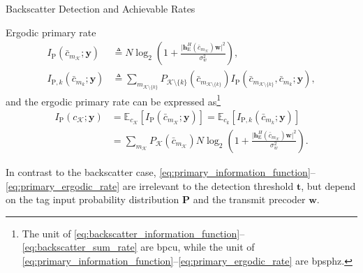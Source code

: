 \documentclass[journal]{IEEEtran}
\begin{document}
\begin{section}{Backscatter Detection and Achievable Rates}
\begin{subsection}{Ergodic primary rate}
			\begin{align}
				I_{\mathrm{P}}(\bar{c}_{m_{\mathcal{K}}};\boldsymbol{y})
				& \triangleq N \log_2 \left(1 + \frac{\lvert \boldsymbol{h}_{\mathrm{E}}^H(\bar{c}_{m_{\mathcal{K}}}) \boldsymbol{w} \rvert^2}{\sigma_w^2}\right),\label{eq:primary_information_function}\\
				I_{\mathrm{P},k}(\bar{c}_{m_k};\boldsymbol{y})
				& \triangleq \sum_{m_{\mathcal{K} \setminus \{k\}}} P_{\mathcal{K} \setminus \{k\}}(\bar{c}_{m_{\mathcal{K} \setminus \{k\}}}) I_{\mathrm{P}}(\bar{c}_{m_{\mathcal{K} \setminus \{k\}}},\bar{c}_{m_k};\boldsymbol{y}),\label{eq:primary_marginal_information_function}
			\end{align}
			and the ergodic primary rate can be expressed as\footnote{The unit of \eqref{eq:backscatter_information_function}--\eqref{eq:backscatter_sum_rate} are \gls{bpcu}, while the unit of \eqref{eq:primary_information_function}--\eqref{eq:primary_ergodic_rate} are \gls{bpsphz}.}
			\begin{subequations}
				\begin{align}
					I_{\mathrm{P}}(c_{\mathcal{K}};\boldsymbol{y})
					& = \mathbb{E}_{c_{\mathcal{K}}} \left[I_{\mathrm{P}}(\bar{c}_{m_{\mathcal{K}}};\boldsymbol{y})\right] = \mathbb{E}_{c_k} \left[I_{\mathrm{P},k}(\bar{c}_{m_k};\boldsymbol{y})\right]\label{eq:primary_ergodic_rate_expectation}\\
					& = \sum_{m_{\mathcal{K}}} P_{\mathcal{K}}(\bar{c}_{m_{\mathcal{K}}}) N \log_2 \left(1 + \frac{\lvert \boldsymbol{h}_{\mathrm{E}}^H(\bar{c}_{m_{\mathcal{K}}}) \boldsymbol{w} \rvert^2}{\sigma_w^2}\right).
					\label{eq:primary_ergodic_rate_expansion}
				\end{align}
				\label{eq:primary_ergodic_rate}
			\end{subequations}

			In contrast to the backscatter case, \eqref{eq:primary_information_function}--\eqref{eq:primary_ergodic_rate} are irrelevant to the detection threshold $\boldsymbol{t}$, but depend on the tag input probability distribution $\boldsymbol{P}$ and the transmit precoder $\boldsymbol{w}$.
		\end{subsection}
	\end{section}
\end{document}
